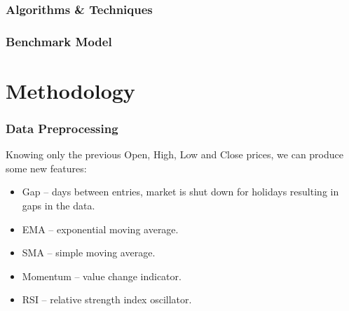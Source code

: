 \documentclass[a4paper,12pt]{article}
\begin{document}
\section{Algorithms \& Techniques}

\section{Benchmark Model}


\part{Methodology}
\section{Data Preprocessing}
Knowing only the previous Open, High, Low and Close prices, we can produce some new features:
\begin{itemize}
	\item Gap -- days between entries, market is shut down for holidays resulting in gaps in the data.
	\item EMA -- exponential moving average.
	\item SMA -- simple moving average.
	\item Momentum -- value change indicator.
	\item RSI -- relative strength index oscillator.
\end{itemize}
\end{document}
